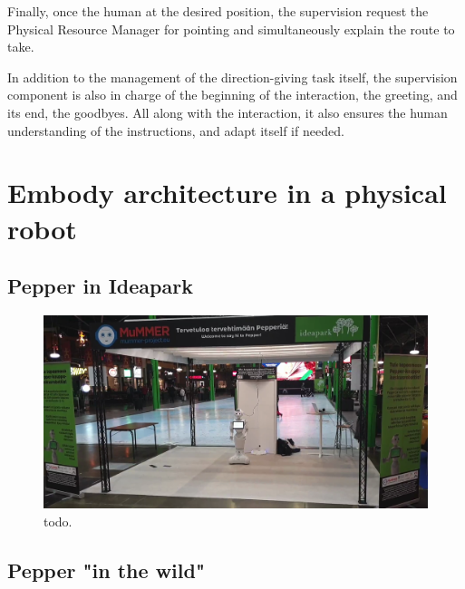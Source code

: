 Finally, once the human at the desired position, the supervision request the Physical Resource Manager for pointing and simultaneously explain the route to take.

In addition to the management of the direction-giving task itself, the supervision component is also in charge of the beginning of the interaction, the greeting, and its end, the goodbyes. All along with the interaction, it also ensures the human understanding of the instructions, and adapt itself if needed.

\section{Embody architecture in a physical robot}

\subsection{Pepper in Ideapark}

\begin{figure}[ht!]
\centering
\includegraphics[scale=0.15]{figures/chapter8/pepper_mall.png}
\caption{\label{fig:chap8_pepper_mall} todo. }
\end{figure}

\subsection{Pepper "in the wild"}